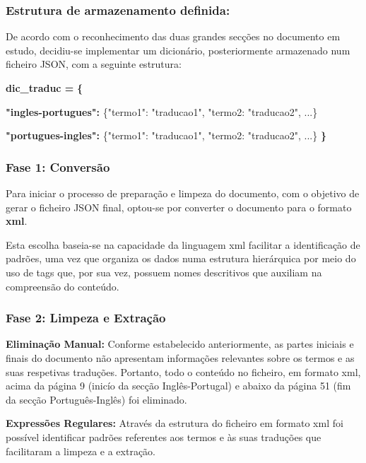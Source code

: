 \subsubsection{Estrutura de armazenamento definida:}

De acordo com o reconhecimento das duas grandes secções no documento em estudo, decidiu-se implementar um dicionário, posteriormente armazenado num ficheiro JSON, com a seguinte estrutura:

\begin{center}
    \textbf{dic\_traduc =}
    \textbf{\{}
\end{center}
\begin{center}
    \textbf{"ingles-portugues":}
    \{"termo1": "traducao1", "termo2: "traducao2", ...\}
\end{center}

\begin{center}
    \textbf{"portugues-ingles":}
   \{"termo1": "traducao1", "termo2: "traducao2", ...\}
   \textbf{\}}
\end{center}

\subsubsection{Fase 1: Conversão}
Para iniciar o processo de preparação e limpeza do documento, com o objetivo de gerar o ficheiro JSON final, optou-se por converter o documento para o formato \textbf{xml}. 

Esta escolha baseia-se na capacidade da linguagem xml facilitar a identificação de padrões, uma vez que organiza os dados numa estrutura hierárquica por meio do uso de tags que, por sua vez, possuem nomes descritivos que auxiliam na compreensão do conteúdo.

\subsubsection{Fase 2: Limpeza e Extração}

\textbf{Eliminação Manual:}
Conforme estabelecido anteriormente, as partes iniciais e finais do documento não apresentam informações relevantes sobre os termos e as suas respetivas traduções. Portanto, todo o conteúdo no ficheiro, em formato xml, acima da página 9 (inicío da secção Inglês-Portugal) e abaixo da página 51 (fim da secção Português-Inglês) foi eliminado. 

\textbf{Expressões Regulares:}
Através da estrutura do ficheiro em formato xml foi possível identificar padrões referentes aos termos e às suas traduções que facilitaram a limpeza e a extração.

